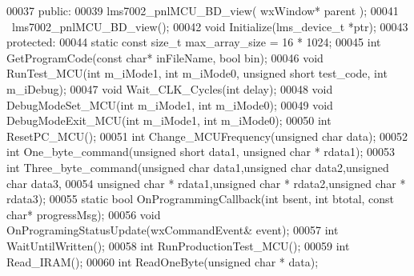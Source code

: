 \begin{DoxyCode}
00037     \textcolor{keyword}{public}:
00039         lms7002_pnlMCU_BD_view( wxWindow* parent );
00041         ~lms7002_pnlMCU_BD_view();
00042         \textcolor{keywordtype}{void} Initialize(lms_device_t *ptr);
00043 \textcolor{keyword}{protected}:
00044     \textcolor{keyword}{static} \textcolor{keyword}{const} \textcolor{keywordtype}{size\_t} max_array_size = 16 * 1024;
00045     \textcolor{keywordtype}{int} GetProgramCode(\textcolor{keyword}{const} \textcolor{keywordtype}{char}* inFileName, \textcolor{keywordtype}{bool} bin);
00046     \textcolor{keywordtype}{void} RunTest_MCU(\textcolor{keywordtype}{int} m_iMode1, \textcolor{keywordtype}{int} m_iMode0, \textcolor{keywordtype}{unsigned} \textcolor{keywordtype}{short} test\_code, \textcolor{keywordtype}{int} 
      m_iDebug);
00047     \textcolor{keywordtype}{void} Wait_CLK_Cycles(\textcolor{keywordtype}{int} delay);
00048     \textcolor{keywordtype}{void} DebugModeSet_MCU(\textcolor{keywordtype}{int} m_iMode1, \textcolor{keywordtype}{int} m_iMode0);
00049     \textcolor{keywordtype}{void} DebugModeExit_MCU(\textcolor{keywordtype}{int} m_iMode1, \textcolor{keywordtype}{int} m_iMode0);
00050     \textcolor{keywordtype}{int} ResetPC_MCU();
00051     \textcolor{keywordtype}{int} Change_MCUFrequency(\textcolor{keywordtype}{unsigned} \textcolor{keywordtype}{char} data);
00052     \textcolor{keywordtype}{int} One_byte_command(\textcolor{keywordtype}{unsigned} \textcolor{keywordtype}{short} data1, \textcolor{keywordtype}{unsigned} \textcolor{keywordtype}{char} * rdata1);
00053     \textcolor{keywordtype}{int} Three_byte_command(\textcolor{keywordtype}{unsigned} \textcolor{keywordtype}{char} data1,\textcolor{keywordtype}{unsigned} \textcolor{keywordtype}{char} data2,\textcolor{keywordtype}{unsigned} \textcolor{keywordtype}{char} data3,
00054         \textcolor{keywordtype}{unsigned} \textcolor{keywordtype}{char} * rdata1,\textcolor{keywordtype}{unsigned} \textcolor{keywordtype}{char} * rdata2,\textcolor{keywordtype}{unsigned} \textcolor{keywordtype}{char} * rdata3);
00055     \textcolor{keyword}{static} \textcolor{keywordtype}{bool} OnProgrammingCallback(\textcolor{keywordtype}{int} bsent, \textcolor{keywordtype}{int} btotal, \textcolor{keyword}{const} \textcolor{keywordtype}{char}* progressMsg);
00056     \textcolor{keywordtype}{void} OnProgramingStatusUpdate(wxCommandEvent& event);
00057     \textcolor{keywordtype}{int} WaitUntilWritten();
00058     \textcolor{keywordtype}{int} RunProductionTest_MCU();
00059     \textcolor{keywordtype}{int} Read_IRAM();
00060     \textcolor{keywordtype}{int} ReadOneByte(\textcolor{keywordtype}{unsigned} \textcolor{keywordtype}{char} * data);

\end{DoxyCode}
